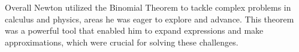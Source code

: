 \documentclass{beamer}
\theoremstyle{plain}
\theoremstyle{definition}
\theoremstyle{remark}
\begin{document}
\begin{frame}{Overall}
Newton utilized the Binomial Theorem to tackle complex problems in calculus and physics, areas he was eager to explore and advance. This theorem was a powerful tool that enabled him to expand expressions and make approximations, which were crucial for solving these challenges.
\end{frame}
\end{document}
